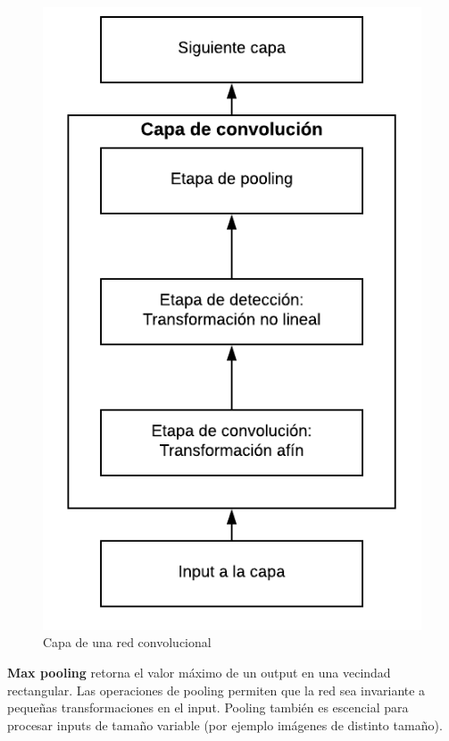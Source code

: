 \begin{figure}[H]
\captionsetup{font=small,labelfont=small}
\caption{Capa de una red convolucional}
\centering
\includegraphics[scale=.8]{img/cap7_CNN.png}
\end{figure}

\textbf{Max pooling} retorna el valor m\'aximo de un output en una vecindad rectangular. Las operaciones de pooling permiten que la red sea invariante a peque{\~{n}}as transformaciones en el input. Pooling tambi\'en es escencial para procesar inputs de tama{\~{n}}o variable (por ejemplo im\'agenes de distinto tama{\~{n}}o).

